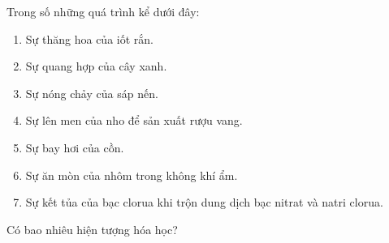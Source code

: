 \begin{bt}
	Trong số những quá trình kể dưới đây:
	\begin{enumerate}
		\item Sự thăng hoa của iốt rắn.
		\item Sự quang hợp của cây xanh.
		\item Sự nóng chảy của sáp nến.
		\item Sự lên men của nho để sản xuất rượu vang.
		\item Sự bay hơi của cồn.
		\item Sự ăn mòn của nhôm trong không khí ẩm.
		\item Sự kết tủa của bạc clorua khi trộn dung dịch bạc nitrat và natri clorua.
	\end{enumerate}
	Có bao nhiêu hiện tượng hóa học?
	\shortans{}
	\loigiai{}
\end{bt}

